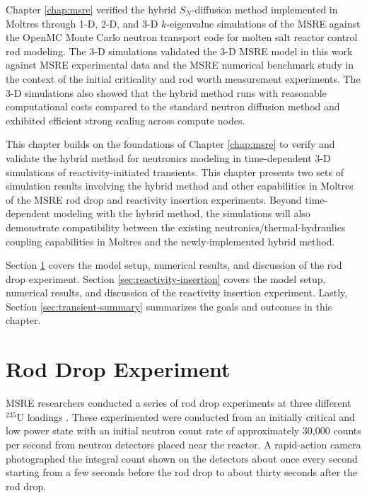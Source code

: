 Chapter \ref{chap:msre} verified the hybrid $S_N$-diffusion method implemented in Moltres through
1-D, 2-D, and 3-D
$k$-eigenvalue simulations of the \gls{MSRE} against the OpenMC Monte Carlo neutron transport code
for molten salt reactor control rod modeling. The 3-D simulations validated the 3-D \gls{MSRE}
model in this work against \gls{MSRE} experimental data and the \gls{MSRE} numerical benchmark
study \cite{fratoni_molten_2020} in the context of the initial criticality and rod worth
measurement experiments. The 3-D simulations also showed that the hybrid method runs with
reasonable computational costs compared to the standard neutron diffusion method and exhibited
efficient strong scaling across compute nodes.

This chapter builds on the foundations of Chapter \ref{chap:msre} to verify and validate the hybrid
method for neutronics modeling in time-dependent 3-D simulations of reactivity-initiated
transients. This chapter presents two sets of simulation results involving the hybrid method and
other capabilities in Moltres of the \gls{MSRE} rod drop and reactivity insertion
experiments. Beyond time-dependent modeling with the hybrid method, the simulations will also
demonstrate compatibility between the existing neutronics/thermal-hydraulics coupling
capabilities in Moltres and the newly-implemented hybrid method.

Section \ref{sec:rod-drop} covers the model setup, numerical results, and discussion of the rod
drop experiment. Section \ref{sec:reactivity-insertion} covers the model setup, numerical results,
and discussion of the reactivity insertion experiment. Lastly, Section \ref{sec:transient-summary}
summarizes the goals and outcomes in this chapter.

\section{Rod Drop Experiment} \label{sec:rod-drop}

\gls{MSRE} researchers conducted a series of rod drop experiments at three different $^{235}$U
loadings \cite{prince_zero-power_1968}. These experimented were conducted from an initially critical
and low power state with an initial neutron count rate of approximately 30,000 counts per second
from neutron detectors placed near the reactor. A rapid-action camera photographed the integral
count shown on the detectors about once every second starting from a few seconds before the rod
drop to about thirty seconds after the rod drop.

